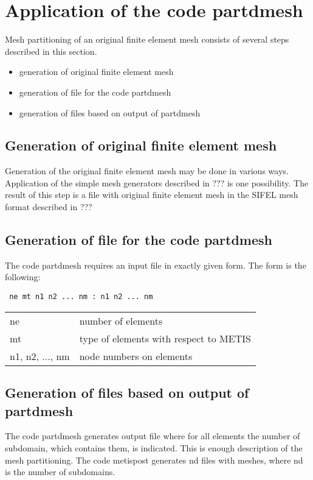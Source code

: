 \documentclass[12pt]{book}
\begin{document}
\section{Application of the code partdmesh}

Mesh partitioning of an original finite element mesh consists of several steps
described in this section.

\begin{itemize}
\item
generation of original finite element mesh
\item
generation of file for the code partdmesh
\item
generation of files based on output of partdmesh
\end{itemize}

\subsection{Generation of original finite element mesh}
Generation of the original finite element mesh may be done in various ways.
Application of the simple mesh generators described in ??? is one
possibility. The result of this step is a file with original finite
element mesh in the SIFEL mesh format described in ???

\subsection{Generation of file for the code partdmesh}

The code partdmesh requires an input file in exactly given form. The form is the following:

\noindent
{\tt
ne mt
n1 n2 ... nm
:
n1 n2 ... nm
}

\begin{tabular}{ll}
ne & number of elements
\\
mt & type of elements with respect to METIS
\\
n1, n2, ..., nm & node numbers on elements
\end{tabular}


\subsection{Generation of files based on output of partdmesh}
The code partdmesh generates output file where for all elements the number of subdomain, which contains them, is indicated.
This is enough description of the mesh partitioning. The code metispost generates nd files with meshes, where
nd is the number of subdomains. 
\end{document}
